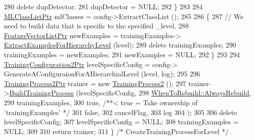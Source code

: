\begin{DoxyCode}
280     \textcolor{keyword}{delete}  dupDetector;
281     dupDetector = NULL;
282   \}
283     
284   \hyperlink{class_k_k_m_l_l_1_1_m_l_class_list}{MLClassListPtr}  mlClasses = config->ExtractClassList ();
285 
286   \{
287     \textcolor{comment}{// We need to build data that is specific to the specified \_level.}
288     \hyperlink{class_k_k_m_l_l_1_1_feature_vector_list}{FeatureVectorListPtr}  newExamples = trainingExamples->
      \hyperlink{class_k_k_m_l_l_1_1_feature_vector_list_a6448547dba5f958dde04c5eaf6db1f53}{ExtractExamplesForHierarchyLevel} (level);
289     \textcolor{keyword}{delete}  trainingExamples;
290     trainingExamples = newExamples;
291     newExamples = NULL;
292   \}
293 
294   \hyperlink{class_k_k_m_l_l_1_1_training_configuration2}{TrainingConfiguration2Ptr}  levelSpecificConfig = config->
      GenerateAConfiguraionForAHierarchialLevel (level, log);
295 
296   \hyperlink{class_k_k_m_l_l_1_1_training_process2}{TrainingProcess2Ptr}  trainer = \textcolor{keyword}{new} \hyperlink{class_k_k_m_l_l_1_1_training_process2_a56455bc6c87316ccfd3afbe4c3323f5e}{TrainingProcess2} ();
297   trainer->\hyperlink{class_k_k_m_l_l_1_1_training_process2_a8b80079d09f7813e347343ebbefb14fb}{BuildTrainingProcess} (levelSpecificConfig,
298                                  \hyperlink{class_k_k_m_l_l_1_1_training_process2_acc48e76f6978c8c8c0c849eec2d0ee53af19cc2f24e3b601e28ca877505de0d4b}{WhenToRebuild::AlwaysRebuild},
299                                  trainingExamples, 
300                                  \textcolor{keyword}{true},        \textcolor{comment}{/**<  true = Take ownership of 'trainingExamples' */}
301                                  \textcolor{keyword}{false},
302                                  cancelFlag,
303                                  log
304                                 );
305 
306   \textcolor{keyword}{delete}  levelSpecificConfig;
307   levelSpecificConfig = NULL;
308   trainingExamples = NULL;
309 
310   \textcolor{keywordflow}{return}  trainer;
311 \}  \textcolor{comment}{/* CreateTrainingProcessForLevel */}
\end{DoxyCode}
